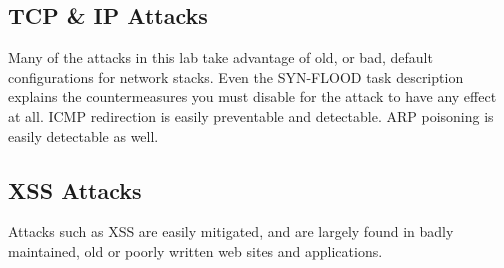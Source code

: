 \subsection{TCP \& IP Attacks}
Many of the attacks in this lab take advantage of old, or bad, default configurations for network stacks.
Even the SYN-FLOOD task description explains the countermeasures you must disable for the attack to have any effect at
all. ICMP redirection is easily preventable and detectable. ARP poisoning is easily detectable as well.

\subsection{XSS Attacks}
Attacks such as XSS are easily mitigated\cite{cheatsheet}, and are largely found in badly maintained, old or poorly written web sites
and applications.
